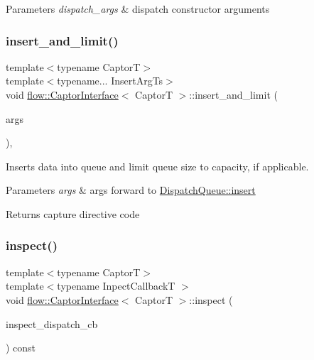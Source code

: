 \begin{DoxyParams}{Parameters}
{\em dispatch\+\_\+args} & dispatch constructor arguments \\
\hline
\end{DoxyParams}
\mbox{\label{classflow_1_1_captor_interface_ab1add272b1b90192edb6c567847140e7}} 
\subsubsection{\texorpdfstring{insert\+\_\+and\+\_\+limit()}{insert\_and\_limit()}}
{\footnotesize\ttfamily template$<$typename CaptorT$>$ \\
template$<$typename... Insert\+Arg\+Ts$>$ \\
void \hyperlink{classflow_1_1_captor_interface}{flow\+::\+Captor\+Interface}$<$ CaptorT $>$\+::insert\+\_\+and\+\_\+limit (\begin{DoxyParamCaption}\item[{Insert\+Arg\+Ts \&\&...}]{args }\end{DoxyParamCaption})\hspace{0.3cm}{\ttfamily [inline]}, {\ttfamily [protected]}}



Inserts data into queue and limit queue size to capacity, if applicable. 


\begin{DoxyParams}{Parameters}
{\em args} & args forward to {\ttfamily \hyperlink{classflow_1_1_dispatch_queue_a5221c73d3790e6795c48229a2bcd7c0e}{Dispatch\+Queue\+::insert}}\\
\hline
\end{DoxyParams}
\begin{DoxyReturn}{Returns}
capture directive code 
\end{DoxyReturn}
\mbox{\label{classflow_1_1_captor_interface_a4648d1a3ec30a603e24e9ba0a667159d}} 
\subsubsection{\texorpdfstring{inspect()}{inspect()}}
{\footnotesize\ttfamily template$<$typename CaptorT$>$ \\
template$<$typename Inpect\+CallbackT $>$ \\
void \hyperlink{classflow_1_1_captor_interface}{flow\+::\+Captor\+Interface}$<$ CaptorT $>$\+::inspect (\begin{DoxyParamCaption}\item[{Inpect\+CallbackT \&\&}]{inspect\+\_\+dispatch\+\_\+cb }\end{DoxyParamCaption}) const\hspace{0.3cm}{\ttfamily [inline]}}



